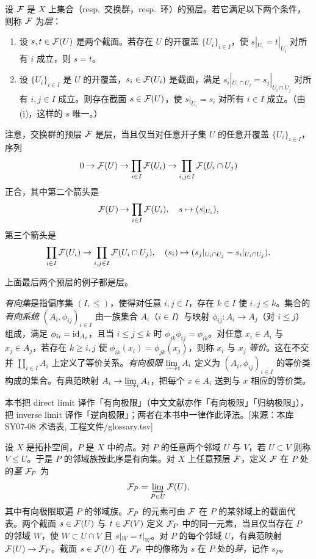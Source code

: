 设 $\mathcal{F}$ 是 $X$ 上集合（resp.\ 交换群，resp.\ 环）的预层。若它满足以下两个条件，则称 $\mathcal{F}$ 为\emph{层}：
\begin{enumerate}[label=(\roman*),leftmargin=2.8em]
  \item 设 $s,t\in \mathcal{F}(U)$ 是两个截面。若存在 $U$ 的开覆盖 $\{U_i\}_{i\in I}$，使 $s|_{U_i}=t|_{U_i}$ 对所有 $i$ 成立，则 $s=t$。
  \item 设 $\{U_i\}_{i\in I}$ 是 $U$ 的开覆盖，$s_i\in \mathcal{F}(U_i)$ 是截面，满足 $s_i|_{U_i\cap U_j}=s_j|_{U_i\cap U_j}$ 对所有 $i,j\in I$ 成立。则存在截面 $s\in \mathcal{F}(U)$，使 $s|_{U_i}=s_i$ 对所有 $i\in I$ 成立。（由 (i)，这样的 $s$ 唯一。）
\end{enumerate}

注意，交换群的预层 $\mathcal{F}$ 是层，当且仅当对任意开子集 $U$ 的任意开覆盖 $\{U_i\}_{i\in I}$，序列
\[
0\to \mathcal{F}(U)\to \prod_{i\in I}\mathcal{F}(U_i)\to \prod_{i,j\in I}\mathcal{F}(U_i\cap U_j)
\]
正合，其中第二个箭头是
\[
\mathcal{F}(U)\to \prod_{i\in I}\mathcal{F}(U_i),\quad s\mapsto (s|_{U_i}),
\]
第三个箭头是
\[
\prod_{i\in I}\mathcal{F}(U_i)\to \prod_{i,j\in I}\mathcal{F}(U_i\cap U_j),\quad (s_i)\mapsto (s_j|_{U_i\cap U_j}-s_i|_{U_i\cap U_j}).
\]

上面最后两个预层的例子都是层。

\emph{有向集}是指偏序集 $(I,\le)$，使得对任意 $i,j\in I$，存在 $k\in I$ 使 $i,j\le k$。集合的\emph{有向系统} $(A_i,\phi_{ij})_{i\in I}$ 由一族集合 $A_i$（$i\in I$）与映射 $\phi_{ij}\colon A_i\to A_j$（对 $i\le j$）组成，满足 $\phi_{ii}=\operatorname{id}_{A_i}$，且当 $i\le j\le k$ 时 $\phi_{jk}\phi_{ij}=\phi_{ik}$。对任意 $x_i\in A_i$ 与 $x_j\in A_j$，若存在 $k\ge i,j$ 使 $\phi_{ik}(x_i)=\phi_{jk}(x_j)$，则称 $x_i$ 与 $x_j$ \emph{等价}。这在不交并 $\coprod_{i\in I}A_i$ 上定义了等价关系。\emph{有向极限} $\varinjlim_i A_i$ 定义为 $(A_i,\phi_{ij})_{i\in I}$ 的等价类构成的集合。有典范映射 $A_i\to \varinjlim_i A_i$，把每个 $x\in A_i$ 送到与 $x$ 相应的等价类。
\begin{tnote}
本书把 direct limit 译作「有向极限」（中文文献亦作「有向极限」「归纳极限」），把 inverse limit 译作「逆向极限」；两者在本书中一律作此译法。[来源：本库 SY07-08 术语表, 工程文件/glossary.tsv]
\end{tnote}

设 $X$ 是拓扑空间，$P$ 是 $X$ 中的点。对 $P$ 的任意两个邻域 $U$ 与 $V$，若 $U\subset V$ 则称 $V\le U$。于是 $P$ 的邻域族按此序是有向集。对 $X$ 上任意预层 $\mathcal{F}$，定义 $\mathcal{F}$ 在 $P$ 处的\emph{茎} $\mathcal{F}_P$ 为
\[
\mathcal{F}_P=\varinjlim_{P\in U}\mathcal{F}(U),
\]
其中有向极限取遍 $P$ 的邻域族。$\mathcal{F}_P$ 的元素可由 $\mathcal{F}$ 在 $P$ 的某邻域上的截面代表。两个截面 $s\in \mathcal{F}(U)$ 与 $t\in \mathcal{F}(V)$ 定义 $\mathcal{F}_P$ 中的同一元素，当且仅当存在 $P$ 的邻域 $W$，使 $W\subset U\cap V$ 且 $s|_W=t|_W$。对 $P$ 的每个邻域 $U$，有典范映射 $\mathcal{F}(U)\to \mathcal{F}_P$。截面 $s\in \mathcal{F}(U)$ 在 $\mathcal{F}_P$ 中的像称为 $s$ 在 $P$ 处的\emph{芽}，记作 $s_P$。

